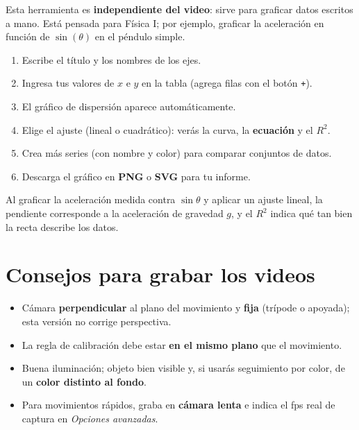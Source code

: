 \documentclass[11pt,a4paper]{article}
\begin{document}
Esta herramienta es \textbf{independiente del video}: sirve para graficar datos
escritos a mano. Está pensada para Física I; por ejemplo, graficar la aceleración
en función de $\sin(\theta)$ en el péndulo simple.

\begin{receta}
  \begin{enumerate}
    \item Escribe el título y los nombres de los ejes.
    \item Ingresa tus valores de $x$ e $y$ en la tabla (agrega filas con el botón
      \texttt{+}).
    \item El gráfico de dispersión aparece automáticamente.
    \item Elige el ajuste (lineal o cuadrático): verás la curva, la \textbf{ecuación}
      y el $R^{2}$.
    \item Crea más series (con nombre y color) para comparar conjuntos de datos.
    \item Descarga el gráfico en \textbf{PNG} o \textbf{SVG} para tu informe.
  \end{enumerate}
\end{receta}

\begin{ejemplo}
  Al graficar la aceleración medida contra $\sin\theta$ y aplicar un ajuste lineal,
  la pendiente corresponde a la aceleración de gravedad $g$, y el $R^{2}$ indica
  qué tan bien la recta describe los datos.
\end{ejemplo}

\section{Consejos para grabar los videos}

\begin{estrategia}
  \begin{itemize}
    \item Cámara \textbf{perpendicular} al plano del movimiento y \textbf{fija}
      (trípode o apoyada); esta versión no corrige perspectiva.
    \item La regla de calibración debe estar \textbf{en el mismo plano} que el
      movimiento.
    \item Buena iluminación; objeto bien visible y, si usarás seguimiento por color,
      de un \textbf{color distinto al fondo}.
    \item Para movimientos rápidos, graba en \textbf{cámara lenta} e indica el fps
      real de captura en \emph{Opciones avanzadas}.
  \end{itemize}
\end{estrategia}
\end{document}
